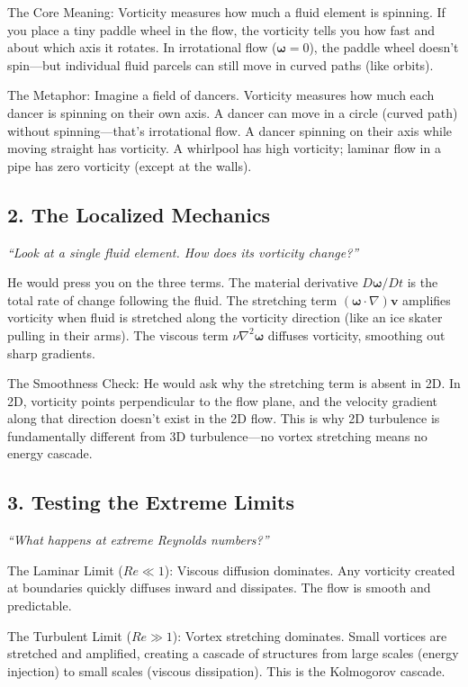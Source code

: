 The Core Meaning: Vorticity measures how much a fluid element is spinning. If you place a tiny paddle wheel in the flow, the vorticity tells you how fast and about which axis it rotates. In irrotational flow ($\boldsymbol{\omega} = 0$), the paddle wheel doesn't spin---but individual fluid parcels can still move in curved paths (like orbits).

The Metaphor: Imagine a field of dancers. Vorticity measures how much each dancer is spinning on their own axis. A dancer can move in a circle (curved path) without spinning---that's irrotational flow. A dancer spinning on their axis while moving straight has vorticity. A whirlpool has high vorticity; laminar flow in a pipe has zero vorticity (except at the walls).

\subsection*{2. The Localized Mechanics}
\textit{``Look at a single fluid element. How does its vorticity change?''}

He would press you on the three terms. The material derivative $D\boldsymbol{\omega}/Dt$ is the total rate of change following the fluid. The stretching term $(\boldsymbol{\omega} \cdot \nabla)\mathbf{v}$ amplifies vorticity when fluid is stretched along the vorticity direction (like an ice skater pulling in their arms). The viscous term $\nu \nabla^2 \boldsymbol{\omega}$ diffuses vorticity, smoothing out sharp gradients.

The Smoothness Check: He would ask why the stretching term is absent in 2D. In 2D, vorticity points perpendicular to the flow plane, and the velocity gradient along that direction doesn't exist in the 2D flow. This is why 2D turbulence is fundamentally different from 3D turbulence---no vortex stretching means no energy cascade.

\subsection*{3. Testing the Extreme Limits}
\textit{``What happens at extreme Reynolds numbers?''}

The Laminar Limit ($Re \ll 1$): Viscous diffusion dominates. Any vorticity created at boundaries quickly diffuses inward and dissipates. The flow is smooth and predictable.

The Turbulent Limit ($Re \gg 1$): Vortex stretching dominates. Small vortices are stretched and amplified, creating a cascade of structures from large scales (energy injection) to small scales (viscous dissipation). This is the Kolmogorov cascade.


